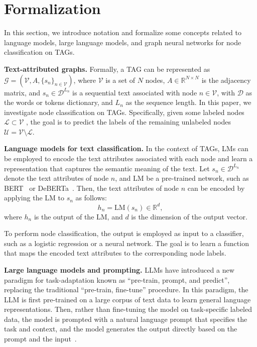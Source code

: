 \documentclass{article}
\begin{document}
\section{Formalization}

In this section, we introduce notation and formalize some concepts related to language models, large language models, and graph neural networks for node classification on TAGs.

\textbf{Text-attributed graphs.}
Formally, a TAG can be represented as $\mathcal{G} = (\mathcal{V}, A, \{s_n\}_{n \in \mathcal{V}})$, where $\mathcal{V}$ is a set of $N$ nodes, $A\in \mathbb{R}^{N\times N}$ is the adjacency matrix, and $s_n\in\mathcal{D}^{L_n}$ is a sequential text associated with node $n \in \mathcal{V}$, with $\mathcal{D}$ as the words or tokens dictionary, and $L_n$ as the sequence length. 
In this paper, we investigate node classification on TAGs.  Specifically, given some labeled nodes $\mathcal{L} \subset \mathcal{V}$ , the goal is to predict the labels of the remaining unlabeled nodes $\mathcal{U} = \mathcal{V} \setminus \mathcal{L}$.

\textbf{Language models for text classification.}
In the context of TAGs,  LMs can be employed to encode the text attributes associated with each node and learn a representation that captures the semantic meaning of the text. Let $s_n\in\mathcal{D}^{L_n}$ denote the text attributes of node $n$, and $\textrm{LM}$ be a pre-trained network, such as BERT~\citep{devlin2018bert} or DeBERTa~\citep{he2021deberta}. Then, the text attributes of node $n$ can be encoded by applying the LM to $s_n$ as follows:
\begin{equation}
    h_n=\textrm{LM}(s_n) \in \mathbb{R}^d,
\end{equation}
where $h_n$ is the output of the LM, and $d$ is the dimension of the output vector.

To perform node classification, the output is employed as input to a classifier, such as a logistic regression or a neural network. The goal is to learn a function that maps the encoded text attributes to the corresponding node labels. 

\textbf{Large language models and prompting.}
LLMs have introduced a new paradigm for task-adaptation known as ``pre-train, prompt, and predict'', replacing the traditional ``pre-train, fine-tune'' procedure. In this paradigm, the LLM is first pre-trained on a large corpus of text data to learn general language representations. Then, rather than fine-tuning the model on task-specific labeled data, the model is prompted with a natural language prompt that specifies the task and context, and the model generates the output directly based on the prompt and the input~\citep{liu2023pre_survey}.
\end{document}
